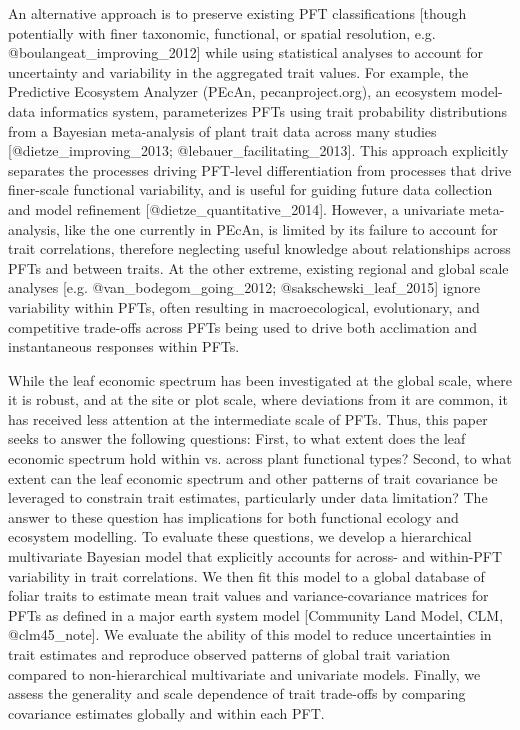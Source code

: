 An alternative approach is to preserve existing PFT classifications
[though potentially with finer taxonomic, functional, or spatial resolution, e.g. @boulangeat_improving_2012]
while using statistical analyses to account for uncertainty and variability in the aggregated trait values.
For example, the Predictive Ecosystem Analyzer (PEcAn, pecanproject.org), an ecosystem model-data informatics system, parameterizes PFTs using trait probability distributions from a Bayesian meta-analysis of plant trait data across many studies
[@dietze_improving_2013; @lebauer_facilitating_2013].
This approach explicitly separates the processes driving PFT-level differentiation from processes that drive finer-scale functional variability,
and is useful for guiding future data collection and model refinement [@dietze_quantitative_2014].
However, a univariate meta-analysis, like the one currently in PEcAn, is limited by its failure to account for trait correlations, therefore neglecting useful knowledge about relationships across PFTs and between traits.
At the other extreme, existing regional and global scale analyses [e.g. @van_bodegom_going_2012; @sakschewski_leaf_2015] ignore variability within PFTs, often resulting in macroecological, evolutionary, and competitive trade-offs across PFTs being used to drive both acclimation and instantaneous responses within PFTs.

While the leaf economic spectrum has been investigated at the global scale, where it is robust, and at the site or plot scale, where deviations from it are common, it has received less attention at the intermediate scale of PFTs.
Thus, this paper seeks to answer the following questions:
First, to what extent does the leaf economic spectrum hold within vs. across plant functional types?
Second, to what extent can the leaf economic spectrum and other patterns of trait covariance be leveraged to constrain trait estimates, particularly under data limitation?
The answer to these question has implications for both functional ecology and ecosystem modelling.
To evaluate these questions, we develop a hierarchical multivariate Bayesian model that explicitly accounts for across- and within-PFT variability in trait correlations.
We then fit this model to a global database of foliar traits to estimate mean trait values and variance-covariance matrices for PFTs as defined in a major earth system model [Community Land Model, CLM, @clm45_note].
We evaluate the ability of this model to reduce uncertainties in trait estimates and reproduce observed patterns of global trait variation compared to non-hierarchical multivariate and univariate models.
Finally, we assess the generality and scale dependence of trait trade-offs by comparing covariance estimates globally and within each PFT.

